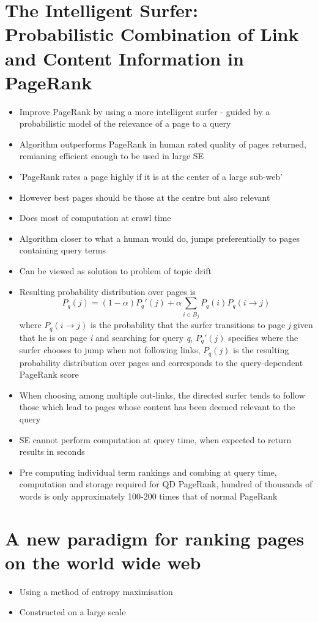 \documentclass[11pt]{report}
\begin{document}
\section{The Intelligent Surfer:
Probabilistic Combination of Link and
Content Information in PageRank}
\begin{itemize}
\item Improve PageRank by using a more intelligent surfer - guided by a probabilistic model of the relevance of a page to a query
\item Algorithm outperforms PageRank in human rated quality of pages returned, remianing efficient enough to be used in large SE
\item 'PageRank rates a page highly if it is at the center of a large sub-web'
\item However best pages should be those at the centre but also relevant
\item Does most of computation at crawl time
\item Algorithm closer to what a human would do, jumps preferentially to pages containing query terms
\item Can be viewed as solution to problem of topic drift
\item Resulting probability distribution over pages is \begin{equation}
P_q(j)=(1-\alpha)P_q'(j)+\alpha\sum_{i\in B_j}P_q(i)P_q(i\rightarrow j)
\end{equation} where $P_q(i\rightarrow j)$ is the probability that the surfer transitions to page \textit{j} given that he is on page \textit{i} and searching for query \textit{q}, $P_q'(j)$ specifies where the surfer chooses to jump when not following links, $P_q(j)$ is the resulting probability distribution over pages and corresponds to the query-dependent PageRank score
\item When choosing among multiple out-links, the directed surfer tends to follow those which lead to pages whose content has been deemed relevant to the query
\item SE cannot perform computation at query time, when expected to return results in seconds
\item Pre computing individual term rankings and combing at query time, computation and storage required for QD PageRank, hundred of thousands of words is only approximately 100-200 times that of normal PageRank
\end{itemize}
\section{A new paradigm for ranking pages on the world wide web}
\begin{itemize}
\item Using a method of entropy maximisation
\item Constructed on a large scale 
\end{itemize}
\end{document}
